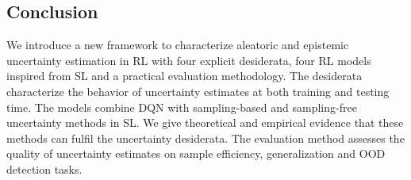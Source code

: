 \subsection*{Conclusion}
\label{sec:conclusion_011}

We introduce a new framework to characterize aleatoric and epistemic uncertainty estimation in RL with four explicit desiderata, four RL models inspired from SL and a practical evaluation methodology. The desiderata characterize the behavior of uncertainty estimates at both training and testing time. The models combine DQN with sampling-based and sampling-free uncertainty methods in SL.
We give theoretical and empirical evidence that these methods can fulfil the uncertainty desiderata. The evaluation method assesses the quality of uncertainty estimates on sample efficiency, generalization and OOD detection tasks.